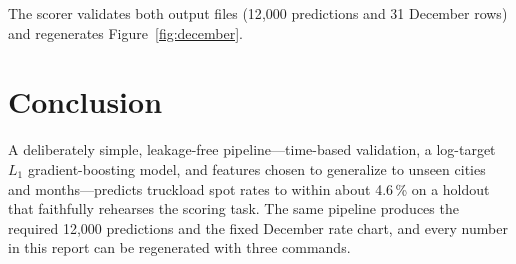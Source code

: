 \documentclass[11pt]{article}
\begin{document}
\noindent The scorer validates both output files (12{,}000 predictions and 31
December rows) and regenerates Figure~\ref{fig:december}.

\section{Conclusion}

\begin{sloppypar}
A deliberately simple, leakage-free pipeline---time-based validation, a
log-target $L_1$ gradient-boosting model, and features chosen to generalize
to unseen cities and months---predicts truckload spot rates to within
about 4.6\,\% on a holdout that faithfully rehearses the scoring task. The
same pipeline produces the required 12{,}000 predictions and the fixed
December rate chart, and every number in this report can be regenerated with
three commands.
\end{sloppypar}
\end{document}
